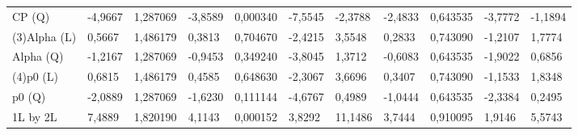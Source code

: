 \begin{table}[H]
{\begin{tabular}{lllllllllll}
\rowcolor[HTML]{FFFFFF} 
{\color[HTML]{000000} CP      (Q)}    & {\color[HTML]{FF0000} -4,9667}  & {\color[HTML]{FF0000} 1,287069} & {\color[HTML]{FF0000} -3,8589}  & {\color[HTML]{FF0000} 0,000340} & {\color[HTML]{FF0000} -7,5545}        & {\color[HTML]{FF0000} -2,3788}        & {\color[HTML]{FF0000} -2,4833}  & {\color[HTML]{FF0000} 0,643535}      & {\color[HTML]{FF0000} -3,7772}        & {\color[HTML]{FF0000} -1,1894}        \\
\rowcolor[HTML]{FFFFFF} 
{\color[HTML]{000000} (3)Alpha   (L)} & {\color[HTML]{000000} 0,5667}   & {\color[HTML]{000000} 1,486179} & {\color[HTML]{000000} 0,3813}   & {\color[HTML]{000000} 0,704670} & {\color[HTML]{000000} -2,4215}        & {\color[HTML]{000000} 3,5548}         & {\color[HTML]{000000} 0,2833}   & {\color[HTML]{000000} 0,743090}      & {\color[HTML]{000000} -1,2107}        & {\color[HTML]{000000} 1,7774}         \\
\rowcolor[HTML]{FFFFFF} 
{\color[HTML]{000000} Alpha   (Q)}    & {\color[HTML]{000000} -1,2167}  & {\color[HTML]{000000} 1,287069} & {\color[HTML]{000000} -0,9453}  & {\color[HTML]{000000} 0,349240} & {\color[HTML]{000000} -3,8045}        & {\color[HTML]{000000} 1,3712}         & {\color[HTML]{000000} -0,6083}  & {\color[HTML]{000000} 0,643535}      & {\color[HTML]{000000} -1,9022}        & {\color[HTML]{000000} 0,6856}         \\
\rowcolor[HTML]{FFFFFF} 
{\color[HTML]{000000} (4)p0      (L)} & {\color[HTML]{000000} 0,6815}   & {\color[HTML]{000000} 1,486179} & {\color[HTML]{000000} 0,4585}   & {\color[HTML]{000000} 0,648630} & {\color[HTML]{000000} -2,3067}        & {\color[HTML]{000000} 3,6696}         & {\color[HTML]{000000} 0,3407}   & {\color[HTML]{000000} 0,743090}      & {\color[HTML]{000000} -1,1533}        & {\color[HTML]{000000} 1,8348}         \\
\rowcolor[HTML]{FFFFFF} 
{\color[HTML]{000000} p0      (Q)}    & {\color[HTML]{000000} -2,0889}  & {\color[HTML]{000000} 1,287069} & {\color[HTML]{000000} -1,6230}  & {\color[HTML]{000000} 0,111144} & {\color[HTML]{000000} -4,6767}        & {\color[HTML]{000000} 0,4989}         & {\color[HTML]{000000} -1,0444}  & {\color[HTML]{000000} 0,643535}      & {\color[HTML]{000000} -2,3384}        & {\color[HTML]{000000} 0,2495}         \\
\rowcolor[HTML]{FFFFFF} 
{\color[HTML]{000000} 1L by 2L}       & {\color[HTML]{FF0000} 7,4889}   & {\color[HTML]{FF0000} 1,820190} & {\color[HTML]{FF0000} 4,1143}   & {\color[HTML]{FF0000} 0,000152} & {\color[HTML]{FF0000} 3,8292}         & {\color[HTML]{FF0000} 11,1486}        & {\color[HTML]{FF0000} 3,7444}   & {\color[HTML]{FF0000} 0,910095}      & {\color[HTML]{FF0000} 1,9146}         & {\color[HTML]{FF0000} 5,5743}         \\

\end{tabular}}
\end{table}
